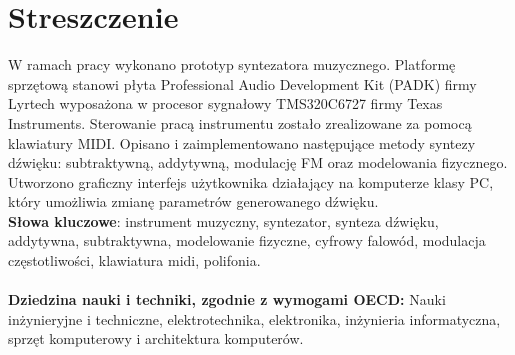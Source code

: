\chapter*{Streszczenie}
W ramach pracy wykonano prototyp syntezatora muzycznego. Platformę sprzętową stanowi płyta Professional Audio Development Kit (PADK) firmy Lyrtech wyposażona w procesor sygnałowy TMS320C6727 firmy Texas Instruments. Sterowanie pracą instrumentu zostało zrealizowane za pomocą klawiatury MIDI. Opisano i zaimplementowano następujące metody syntezy dźwięku: subtraktywną, addytywną, modulację FM oraz modelowania fizycznego. Utworzono graficzny interfejs użytkownika działający na komputerze klasy PC, który umożliwia zmianę parametrów generowanego dźwięku.
\newline
\\
\textbf{Słowa kluczowe}: instrument muzyczny, syntezator, synteza dźwięku, addytywna, subtraktywna, modelowanie fizyczne, cyfrowy falowód, modulacja częstotliwości, klawiatura midi, polifonia.
\\
\\
\textbf{Dziedzina nauki i techniki, zgodnie z wymogami OECD:} Nauki inżynieryjne i techniczne, elektrotechnika, elektronika, inżynieria informatyczna, sprzęt komputerowy i architektura komputerów.
